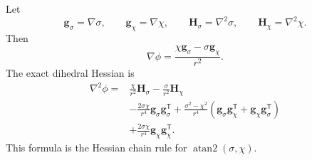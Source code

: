 \documentclass[11pt]{article}
\newcommand{\T}{\mathsf{T}}
\newcommand{\grad}{\nabla}
\newcommand{\Hess}{\nabla^2}
\newcommand{\atanTwo}{\operatorname{atan2}}
\begin{document}
Let
\begin{equation}
  \mathbf{g}_{\sigma}=\grad\sigma,
  \qquad
  \mathbf{g}_{\chi}=\grad\chi,
  \qquad
  \mathbf{H}_{\sigma}=\Hess\sigma,
  \qquad
  \mathbf{H}_{\chi}=\Hess\chi.
\end{equation}
Then
\begin{equation}
  \boxed{
  \grad\phi
  =\frac{\chi\mathbf{g}_{\sigma}-\sigma\mathbf{g}_{\chi}}{r^2}.}
  \label{eq:dihedral-gradient}
\end{equation}
The exact dihedral Hessian is
\begin{equation}
  \boxed{\begin{aligned}
  \Hess\phi
  ={}&\frac{\chi}{r^2}\mathbf{H}_{\sigma}
     -\frac{\sigma}{r^2}\mathbf{H}_{\chi}
  \\
  &-\frac{2\sigma\chi}{r^4}
      \mathbf{g}_{\sigma}\mathbf{g}_{\sigma}^\T
  +\frac{\sigma^2-\chi^2}{r^4}
      \left(
        \mathbf{g}_{\sigma}\mathbf{g}_{\chi}^\T
        +\mathbf{g}_{\chi}\mathbf{g}_{\sigma}^\T
      \right)
  \\
  &+\frac{2\sigma\chi}{r^4}
      \mathbf{g}_{\chi}\mathbf{g}_{\chi}^\T.
  \end{aligned}}
  \label{eq:dihedral-hessian}
\end{equation}
This formula is the Hessian chain rule for $\atanTwo(\sigma,\chi)$.
\end{document}
